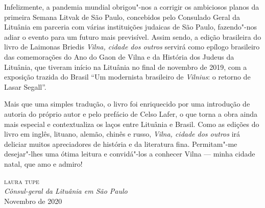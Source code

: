 Infelizmente, a pandemia mundial obrigou"-nos a corrigir os ambiciosos
planos da primeira Semana Litvak de São Paulo, concebidos pelo Consulado
Geral da Lituânia em parceria com várias instituições judaicas de São
Paulo, fazendo"-nos adiar o evento para um futuro mais previsível. Assim
sendo, a edição brasileira do livro de Laimonas Briedis \textit{Vilna, cidade
dos outros} servirá como epílogo brasileiro das comemorações do
Ano do Gaon de Vilna e da História dos Judeus da Lituânia, que
tiveram início na Lituânia no final de novembro de 2019, com a exposição
trazida do Brasil ``Um modernista brasileiro de \textit{Vilnius}: o retorno de
Lasar Segall''.

Mais que uma simples tradução, o livro foi enriquecido por uma
introdução de autoria do próprio autor e pelo prefácio de Celso Lafer, o
que torna a obra ainda mais especial e contextualiza os laços entre
Lituânia e Brasil. Como as edições do livro em inglês, lituano, alemão,
chinês e russo, \textit{Vilna, cidade dos outros} irá deliciar muitos
apreciadores de história e da literatura fina. Permitam"-me desejar"-lhes
uma ótima leitura e convidá"-los a conhecer Vilna --- minha cidade natal,
que amo e admiro!

\begin{flushright}
\textsc{laura tupe}\\
\textit{Cônsul-geral da Lituânia em São Paulo}\\
\medskip
Novembro de 2020
\end{flushright}